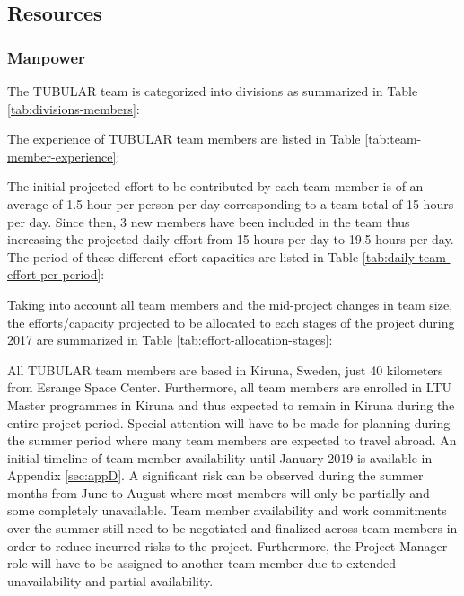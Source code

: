 \subsection{Resources}

\subsubsection{Manpower}
The TUBULAR team is categorized into divisions as summarized in Table \ref{tab:divisions-members}:



The experience of TUBULAR team members are listed in Table \ref{tab:team-member-experience}:



The initial projected effort to be contributed by each team member is of an average of 1.5 hour per person per day corresponding to a team total of 15 hours per day. Since then, 3 new members have been included in the team thus increasing the projected daily effort from 15 hours per day to 19.5 hours per day. The period of these different effort capacities are listed in Table \ref{tab:daily-team-effort-per-period}:



Taking into account all team members and the mid-project changes in team size, the efforts/capacity projected to be allocated to each stages of the project during 2017 are summarized in Table \ref{tab:effort-allocation-stages}:



All TUBULAR team members are based in Kiruna, Sweden, just 40 kilometers from Esrange Space Center. Furthermore, all team members are enrolled in LTU Master programmes in Kiruna and thus expected to remain in Kiruna during the entire project period. Special attention will have to be made for planning during the summer period where many team members are expected to travel abroad. An initial timeline of team member availability  until January 2019 is available in Appendix \ref{sec:appD}. A significant risk can be observed during the summer months from June to August where most members will only be partially and some completely unavailable. Team member availability and work commitments over the summer still need to be negotiated and finalized across team members in order to reduce incurred risks to the project. Furthermore, the Project Manager role will have to be assigned to another team member due to extended unavailability and partial availability.

